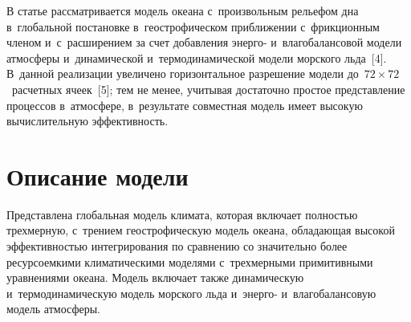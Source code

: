 \begin{multicols}{2}
  В статье рассматривается модель океана с~произвольным рельефом дна 
в~глобальной постановке в~геострофическом приближении с~фрикционным 
членом и~с~расширением за счет добавления энерго- и~влагобалансовой 
модели атмосферы и~динамической и~термодинамической модели морского 
льда~[4]. В~данной реализации увеличено горизонтальное разрешение модели 
до~$72 \times 72$~расчетных ячеек~[5]; тем не менее, учитывая достаточно простое 
представление процессов в~атмосфере, в~результате совместная модель имеет 
высокую вычислительную эффективность.

\vspace*{-3pt}
  
\section{Описание модели}

\vspace*{-2pt}

  Представлена глобальная модель климата, которая включает полностью 
трехмерную, с~трением геострофическую модель океана, обладающая высокой 
эффективностью интегрирования по сравнению со значительно более 
ресурсоемкими климатическими моделями с~трехмерными примитивными 
уравнениями океана. Модель включает также динамическую 
и~термодинамическую модель морского льда и~энерго- и~влагобалансовую 
модель ат\-мо\-сферы.
  

\end{multicols}
